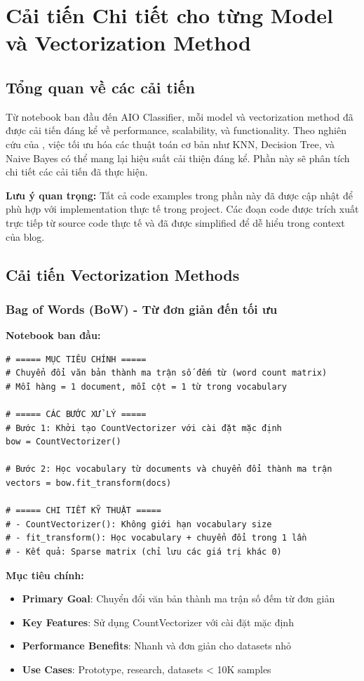 \section{Cải tiến Chi tiết cho từng Model và Vectorization Method}

\subsection{Tổng quan về các cải tiến}

Từ notebook ban đầu đến AIO Classifier, mỗi model và vectorization method đã được cải tiến đáng kể về performance, scalability, và functionality. Theo nghiên cứu của \cite{domingos2012}, việc tối ưu hóa các thuật toán cơ bản như KNN, Decision Tree, và Naive Bayes có thể mang lại hiệu suất cải thiện đáng kể. Phần này sẽ phân tích chi tiết các cải tiến đã thực hiện.

\textbf{Lưu ý quan trọng:} Tất cả code examples trong phần này đã được cập nhật để phù hợp với implementation thực tế trong project. Các đoạn code được trích xuất trực tiếp từ source code thực tế và đã được simplified để dễ hiểu trong context của blog.

\subsection{Cải tiến Vectorization Methods}

\subsubsection{Bag of Words (BoW) - Từ đơn giản đến tối ưu}

\textbf{Notebook ban đầu:}
\begin{verbatim}
# ===== MỤC TIÊU CHÍNH =====
# Chuyển đổi văn bản thành ma trận số đếm từ (word count matrix)
# Mỗi hàng = 1 document, mỗi cột = 1 từ trong vocabulary

# ===== CÁC BƯỚC XỬ LÝ =====
# Bước 1: Khởi tạo CountVectorizer với cài đặt mặc định
bow = CountVectorizer()

# Bước 2: Học vocabulary từ documents và chuyển đổi thành ma trận
vectors = bow.fit_transform(docs)

# ===== CHI TIẾT KỸ THUẬT =====
# - CountVectorizer(): Không giới hạn vocabulary size
# - fit_transform(): Học vocabulary + chuyển đổi trong 1 lần
# - Kết quả: Sparse matrix (chỉ lưu các giá trị khác 0)
\end{verbatim}

\textbf{Mục tiêu chính:}
\begin{itemize}
    \item \textbf{Primary Goal}: Chuyển đổi văn bản thành ma trận số đếm từ đơn giản
    \item \textbf{Key Features}: Sử dụng CountVectorizer với cài đặt mặc định
    \item \textbf{Performance Benefits}: Nhanh và đơn giản cho datasets nhỏ
    \item \textbf{Use Cases}: Prototype, research, datasets < 10K samples
\end{itemize}

